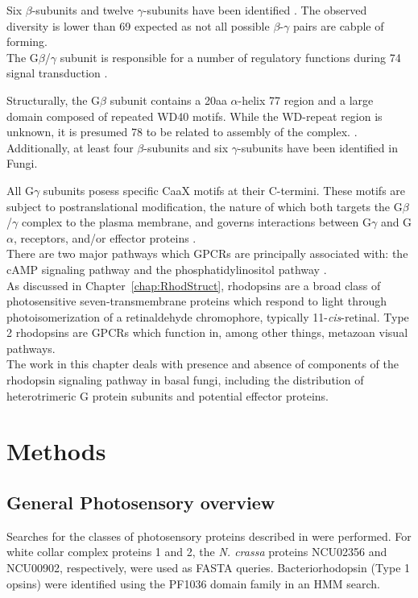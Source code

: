 \indent Six $\beta$-subunits and twelve $\gamma$-subunits have been identified \cite{}. The observed diversity is lower than
 69 expected as not all possible $\beta$-$\gamma$ pairs are cabple of forming.\\

\indent The G$\beta$/$\gamma$ subunit is responsible for a number of regulatory functions during 
 74 signal transduction \cite{Clapham1997}.

\indent Structurally, the G$\beta$ subunit contains a 20aa $\alpha$-helix
 77 region and a large domain composed of repeated WD40 motifs. While the WD-repeat region is unknown, it is presumed
 78 to be related to assembly of the complex. \cite{Clapham1997}.\\

\indent Additionally, at least four $\beta$-subunits and six $\gamma$-subunits have been identified \cite{Hepler1992} in Fungi.

\indent All G$\gamma$ subunits posess specific CaaX motifs at their C-termini. These motifs are subject to 
postranslational modification, the nature of which both targets the G$\beta$/$\gamma$ complex to 
the plasma membrane, and governs interactions between G$\gamma$ and G$\alpha$, receptors, and/or 
effector proteins \cite{Krystofova2005}.\\

\indent There are two major pathways which GPCRs are principally associated with: the cAMP signaling pathway and the phosphatidylinositol pathway \cite{Gilman1987}.\\

\indent As discussed in Chapter~\ref{chap:RhodStruct}, rhodopsins are a broad class of photosensitive 
seven-transmembrane proteins which respond to light through photoisomerization of a retinaldehyde chromophore, 
typically 11-\textit{cis}-retinal. Type 2 rhodopsins are GPCRs which function in, among other things, metazoan visual pathways.\\

\indent The work in this chapter deals with presence and absence of components of the 
rhodopsin signaling pathway in basal fungi, including the distribution of heterotrimeric 
G protein subunits and potential effector proteins.\

\section{Methods}
\subsection*{General Photosensory overview}
Searches for the classes of photosensory proteins described in \cite{Idnurm2010} were performed. For white collar complex proteins 1 and 2, the \textit{N. crassa} proteins NCU02356 and NCU00902, respectively, were used as FASTA queries. Bacteriorhodopsin (Type 1 opsins) were identified using the PF1036 domain family in an HMM search.\\


